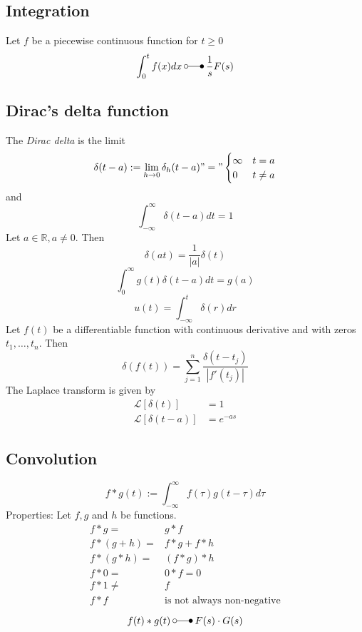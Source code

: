 \subsection{Integration}
Let $f$ be a piecewise continuous function for $t\geq0$
\begin{equation*}
    \int_{0}^{t}f(x)dx \:\laplace\: \frac{1}{s}F(s)
\end{equation*}

\subsection{Dirac's delta function}
The \textit{Dirac delta} is the limit
\begin{equation*}
    \delta(t-a):=\lim_{h\to0}\delta_h(t-a)"="
    \begin{cases}
        \infty&t=a\\
        0&t\ne a
    \end{cases}
\end{equation*}
and
\begin{equation*}
    \int_{-\infty}^{\infty}\delta(t-a)dt=1
\end{equation*}
Let $a \in \mathbb{R}, a \ne 0$. Then
\begin{equation*}
    \delta(at)=\frac1{|a|}\delta(t)
\end{equation*}
\begin{equation*}
    \int_{0}^{\infty} g(t)\delta(t-a)dt=g(a)
\end{equation*}
\begin{equation*}
    u(t)=\int_{-\infty}^{t}\delta(r)dr
\end{equation*}
Let $f(t)$ be a differentiable function with continuous derivative and with zeros $t_1,\dots,t_n$. Then
\begin{equation*}
    \delta(f(t))=\sum_{j=1}^n\frac{\delta(t-t_j)}{|f'(t_j)|}
\end{equation*}
The Laplace transform is given by
\begin{align*}
    \mathcal{L}[\delta(t)] &= 1 \\
    \mathcal{L}[\delta(t-a)] &= e^{-as}
\end{align*}

\subsection{Convolution}
\begin{equation*}
    f*g(t):=\int_{-\infty}^{\infty}f(\tau)g(t-\tau)d\tau
\end{equation*}
Properties: Let $f,g$ and $h$ be functions.
\begin{align*}
    f*g =& g*f \\
    f*(g+h) =& f*g+f*h \\
    f*(g*h) =& (f*g)*h \\
    f*0 =& 0*f=0 \\
    f*1 \ne& f \\
    f*f \;&\text{is not always non-negative}
\end{align*}
\begin{equation*}
    f(t)*g(t) \:\laplace\: F(s)\cdot G(s)
\end{equation*}

